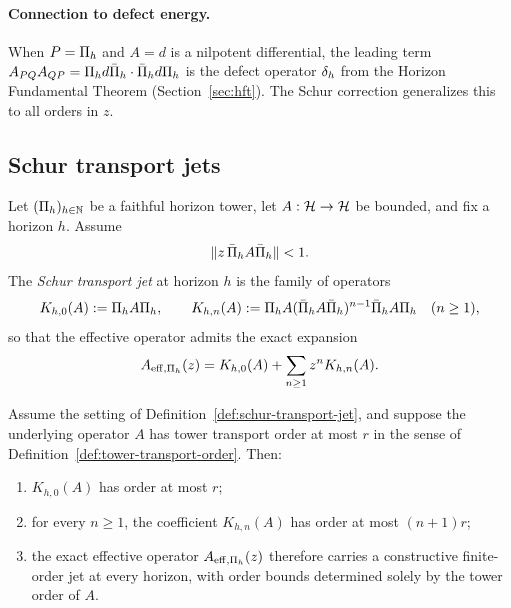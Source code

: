 \paragraph{Connection to defect energy.}
When $P = \CCPi{h}$ and $A = d$ is a nilpotent differential, the leading term $\CCBlockPQ{A} \CCBlockQP{A} = \CCPi{h} d \CCPibar{h} \cdot \CCPibar{h} d \CCPi{h}$ is the defect operator $\CCDefect{d}{h}$ from the Horizon Fundamental Theorem (Section~\ref{sec:hft}).
The Schur correction generalizes this to all orders in $z$.

\subsection{Schur transport jets}
\label{subsec:schur-transport-jet}

\begin{definition}
\label{def:schur-transport-jet}
Let $(\CCPi{h})_{h\in\bbN}$ be a faithful horizon tower, let
$A:\cH\to\cH$ be bounded, and fix a horizon $h$. Assume
\[
\|z\,\CCPibar{h}A\CCPibar{h}\|<1.
\]
The \emph{Schur transport jet} at horizon $h$ is the family of operators
\[
K_{h,0}(A):=\CCPi{h}A\CCPi{h},
\qquad
K_{h,n}(A):=\CCPi{h}A(\CCPibar{h}A\CCPibar{h})^{n-1}\CCPibar{h}A\CCPi{h}
\quad(n\ge1),
\]
so that the effective operator admits the exact expansion
\[
\CCAeff{A}{\CCPi{h}}(z)=K_{h,0}(A)+\sum_{n\ge1} z^n K_{h,n}(A).
\]
\end{definition}

\begin{theorem}
\label{thm:schur-transport-jet-order}
Assume the setting of Definition~\ref{def:schur-transport-jet}, and suppose the
underlying operator $A$ has tower transport order at most $r$ in the sense of
Definition~\ref{def:tower-transport-order}. Then:
\begin{enumerate}[label=(\roman*), leftmargin=2em, itemsep=0.2em]
\item $K_{h,0}(A)$ has order at most $r$;
\item for every $n\ge1$, the coefficient $K_{h,n}(A)$ has order at most
      $(n+1)r$;
\item the exact effective operator $\CCAeff{A}{\CCPi{h}}(z)$ therefore carries a
      constructive finite-order jet at every horizon, with order bounds
      determined solely by the tower order of $A$.
\end{enumerate}
\end{theorem}

